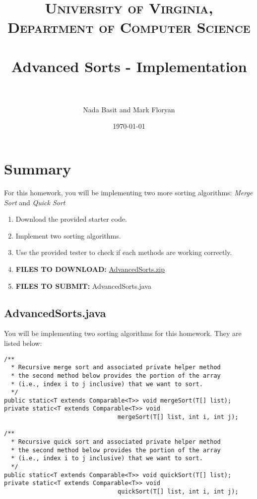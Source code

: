 \documentclass[paper=a4, fontsize=11pt, parskip=full]{scrartcl} %
\title{
\normalfont \normalsize
\textsc{University of Virginia, Department of Computer Science} \\ [25pt] %
\horrule{0.5pt} \\[0.4cm] %
\huge Advanced Sorts - Implementation \\ %
\horrule{2pt} \\[0.5cm] %
}
\author{Nada Basit and Mark Floryan}
\date{\normalsize\today} %
\numberwithin{equation}{section} %
\numberwithin{figure}{section} %
\numberwithin{table}{section} %
\begin{document}
\maketitle %


\section{Summary}

For this homework, you will be implementing two more sorting algorithms: \emph{Merge Sort} and \emph{Quick Sort}

\begin{enumerate}
	\item Download the provided starter code.
	\item Implement two sorting algorithms.
	\item Use the provided tester to check if each methods are working correctly.
	\item \textbf{FILES TO DOWNLOAD:} \href{https://github.com/uva-cs/dsa1/blob/main/homeworks/AdvancedSorts/code/AdvancedSorts.zip?raw=true}{AdvancedSorts.zip}
	\item \textbf{FILES TO SUBMIT:} AdvancedSorts.java
\end{enumerate}


\subsection{AdvancedSorts.java}

You will be implementing two sorting algorithms for this homework. They are listed below:

\begin{lstlisting}
/**
  * Recursive merge sort and associated private helper method
  * the second method below provides the portion of the array
  * (i.e., index i to j inclusive) that we want to sort.
  */
public static<T extends Comparable<T>> void mergeSort(T[] list);
private static<T extends Comparable<T>> void
								mergeSort(T[] list, int i, int j);

/**
  * Recursive quick sort and associated private helper method
  * the second method below provides the portion of the array
  * (i.e., index i to j inclusive) that we want to sort.
  */
public static<T extends Comparable<T>> void quickSort(T[] list);
private static<T extends Comparable<T>> void
								quickSort(T[] list, int i, int j);
\end{lstlisting}
\end{document}

